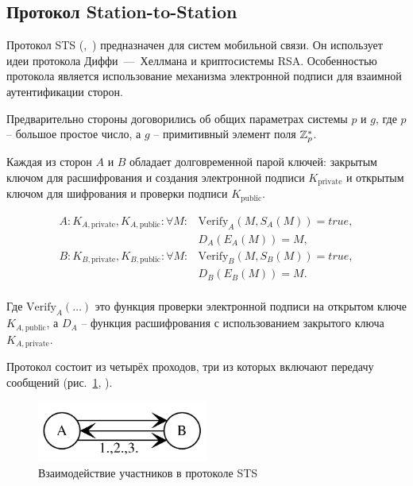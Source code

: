 \subsection{Протокол Station-to-Station}\label{section-protocols-sts}

Протокол STS (,~\cite{Diffie:Oorschot:Wiener:1992}) предназначен для систем мобильной связи. Он использует идеи протокола Диффи~---~Хеллмана и криптосистемы RSA. Особенностью протокола является использование механизма электронной подписи для взаимной аутентификации сторон.

Предварительно стороны договорились об общих параметрах системы $p$ и $g$, где $p$ -- большое простое число, а $g$ -- примитивный элемент поля $\mathbb{Z}_p^*$.

Каждая из сторон $A$ и $B$ обладает долговременной парой ключей: закрытым ключом для расшифрования и создания электронной подписи $K_{\text{private}}$ и открытым ключом для шифрования и проверки подписи $K_{\text{public}}$.

\[\begin{array}{ll}
    A: K_{A,\text{private}}, K_{A,\text{public}}: \forall M : & \text{Verify}_A ( M, S_A( M ) ) = true, \\
                                                & D_A ( E_A( M ) ) = M, \\
    B: K_{B,\text{private}}, K_{B,\text{public}}: \forall M : & \text{Verify}_B ( M, S_B( M ) ) = true, \\
                                                & D_B ( E_B( M ) ) = M. \\
\end{array}\]

Где $\text{Verify}_A(\dots)$ это функция проверки электронной подписи на открытом ключе $K_{A, \text{public}}$, а $D_A$ -- функция расшифрования с использованием закрытого ключа $K_{A, \text{private}}$.

Протокол состоит из четырёх проходов, три из которых включают передачу сообщений (рис.~\ref{fig:key_distribution-sts}, \cite{Cheremushkin:2009}).

\begin{figure}
    \centering
    \includegraphics[width=0.5\textwidth]{pic/key_distribution-sts}
    \caption{Взаимодействие участников в протоколе STS\label{fig:key_distribution-sts}}
\end{figure}

